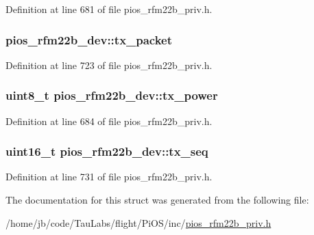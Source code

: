 \-Definition at line 681 of file pios\-\_\-rfm22b\-\_\-priv.\-h.

\hypertarget{structpios__rfm22b__dev_a3b7420bb896bb0b1504c4795c8af9087}{
\subsubsection[{tx\-\_\-packet}]{ {\bf pios\-\_\-rfm22b\-\_\-dev\-::tx\-\_\-packet}}}\label{structpios__rfm22b__dev_a3b7420bb896bb0b1504c4795c8af9087}


\-Definition at line 723 of file pios\-\_\-rfm22b\-\_\-priv.\-h.

\hypertarget{structpios__rfm22b__dev_a3ca116567675ce2311161483fe4c9ff4}{
\subsubsection[{tx\-\_\-power}]{\setlength{\rightskip}{0pt plus 5cm}uint8\-\_\-t {\bf pios\-\_\-rfm22b\-\_\-dev\-::tx\-\_\-power}}}\label{structpios__rfm22b__dev_a3ca116567675ce2311161483fe4c9ff4}


\-Definition at line 684 of file pios\-\_\-rfm22b\-\_\-priv.\-h.

\hypertarget{structpios__rfm22b__dev_ac7ab84030bbfedd9cf397152e1d17ff9}{
\subsubsection[{tx\-\_\-seq}]{\setlength{\rightskip}{0pt plus 5cm}uint16\-\_\-t {\bf pios\-\_\-rfm22b\-\_\-dev\-::tx\-\_\-seq}}}\label{structpios__rfm22b__dev_ac7ab84030bbfedd9cf397152e1d17ff9}


\-Definition at line 731 of file pios\-\_\-rfm22b\-\_\-priv.\-h.



\-The documentation for this struct was generated from the following file\-:\begin{DoxyCompactItemize}
\item 
/home/jb/code/\-Tau\-Labs/flight/\-Pi\-O\-S/inc/\hyperlink{pios__rfm22b__priv_8h}{pios\-\_\-rfm22b\-\_\-priv.\-h}\end{DoxyCompactItemize}
